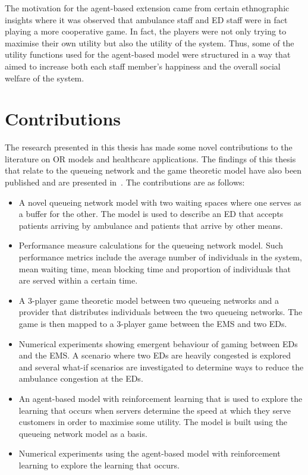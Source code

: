 The motivation for the agent-based extension came from certain ethnographic
insights where it was observed that ambulance staff and ED staff were in fact
playing a more cooperative game.
In fact, the players were not only trying to maximise their own utility but
also the utility of the system.
Thus, some of the utility functions used for the agent-based model were
structured in a way that aimed to increase both each staff member's happiness
and the overall social welfare of the system.



\section{Contributions}

The research presented in this thesis has made some novel contributions to the
literature on OR models and healthcare applications.
The findings of this thesis that relate to the queueing network and the game
theoretic model have also been published and are presented
in~\cite{panayides2023game}.
The contributions are as follows:

\begin{itemize}
    \item A novel queueing network model with two waiting spaces where one
    serves as a buffer for the other.
    The model is used to describe an ED that accepts patients arriving by
    ambulance and patients that arrive by other means.
    \item Performance measure calculations for the queueing network model.
    Such performance metrics include the average number of individuals in the
    system, mean waiting time, mean blocking time and proportion of individuals
    that are served within a certain time.
    \item A 3-player game theoretic model between two queueing networks and a
    provider that distributes individuals between the two queueing networks.
    The game is then mapped to a 3-player game between the EMS and two EDs.
    \item Numerical experiments showing emergent behaviour of gaming between
    EDs and the EMS.
    A scenario where two EDs are heavily congested is explored and several
    what-if scenarios are investigated to determine ways to reduce the
    ambulance congestion at the EDs.
    \item An agent-based model with reinforcement learning that is used to
    explore the learning that occurs when servers determine the speed at which
    they serve customers in order to maximise some utility.
    The model is built using the queueing network model as a basis.
    \item Numerical experiments using the agent-based model with reinforcement
    learning to explore the learning that occurs.
\end{itemize}

